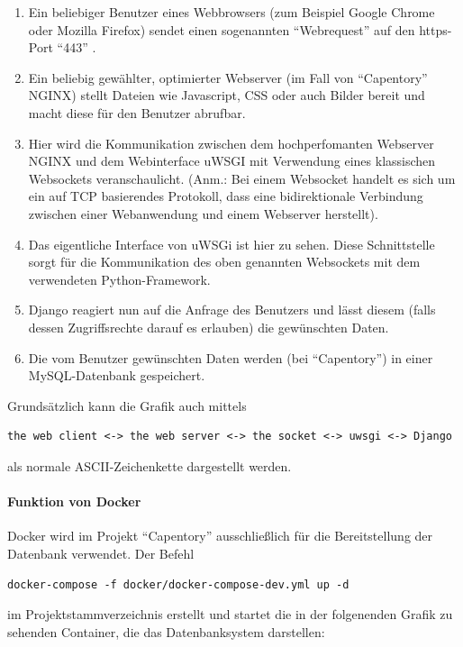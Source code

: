 \begin{enumerate}
\def\labelenumi{\arabic{enumi}.}
\tightlist
\item
  Ein beliebiger Benutzer eines Webbrowsers (zum Beispiel Google Chrome
  oder Mozilla Firefox) sendet einen sogenannten ``Webrequest'' auf den
  https-Port ``443'' .
\item
  Ein beliebig gewählter, optimierter Webserver (im Fall von
  ``Capentory'' NGINX) stellt Dateien wie Javascript, CSS oder auch
  Bilder bereit und macht diese für den Benutzer abrufbar.
\item
  Hier wird die Kommunikation zwischen dem hochperfomanten Webserver
  NGINX und dem Webinterface uWSGI mit Verwendung eines klassischen
  Websockets veranschaulicht. (Anm.: Bei einem Websocket handelt es sich
  um ein auf TCP basierendes Protokoll, dass eine bidirektionale
  Verbindung zwischen einer Webanwendung und einem Webserver herstellt).
\item
  Das eigentliche Interface von uWSGi ist hier zu sehen. Diese
  Schnittstelle sorgt für die Kommunikation des oben genannten
  Websockets mit dem verwendeten Python-Framework.
\item
  Django reagiert nun auf die Anfrage des Benutzers und lässt diesem
  (falls dessen Zugriffsrechte darauf es erlauben) die gewünschten
  Daten.
\item
  Die vom Benutzer gewünschten Daten werden (bei ``Capentory'') in einer
  MySQL-Datenbank gespeichert.
\end{enumerate}

Grundsätzlich kann die Grafik auch mittels

\begin{verbatim}
the web client <-> the web server <-> the socket <-> uwsgi <-> Django
\end{verbatim}

als normale ASCII-Zeichenkette dargestellt werden.

\hypertarget{funktion-von-docker}{%
\paragraph{Funktion von Docker}\label{funktion-von-docker}}

Docker wird im Projekt ``Capentory'' ausschließlich für die
Bereitstellung der Datenbank verwendet. Der Befehl

\texttt{docker-compose\ -f\ docker/docker-compose-dev.yml\ up\ -d}

im Projektstammverzeichnis erstellt und startet die in der folgenenden
Grafik zu sehenden Container, die das Datenbanksystem darstellen:

